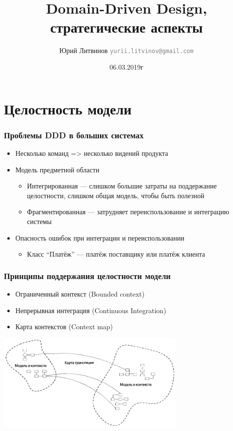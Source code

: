 \documentclass[xetex,mathserif,serif]{beamer}
\title{Domain-Driven Design, стратегические аспекты}
\author[Юрий Литвинов]{Юрий Литвинов \newline \textcolor{gray}{\small\texttt{yurii.litvinov@gmail.com}}}
\date{06.03.2019г}
\begin{document}
	
	\frame{\titlepage}

	\section{Целостность модели}

	\begin{frame}
		\frametitle{Проблемы DDD в больших системах}
		\begin{itemize}
			\item Несколько команд => несколько видений продукта
			\item Модель предметной области
			\begin{itemize}
				\item Интегрированная --- слишком большие затраты на поддержание целостности, слишком общая модель, чтобы быть полезной
				\item Фрагментированная --- затрудняет переиспользование и интеграцию системы
			\end{itemize}
			\item Опасность ошибок при интеграции и переиспользовании
			\begin{itemize}
				\item Класс ``Платёж'' --- платёж поставщику или платёж клиента
			\end{itemize}
		\end{itemize}
	\end{frame}

	\begin{frame}
		\frametitle{Принципы поддержания целостности модели}
		\begin{itemize}
			\item Ограниченный контекст (Bounded context)
			\item Непрерывная интеграция (Continuous Integration)
			\item Карта контекстов (Context map)
		\end{itemize}
		\begin{center}
			\includegraphics[width=0.7\textwidth]{contextMap.png}
		\end{center}
	\end{frame}
\end{document}

